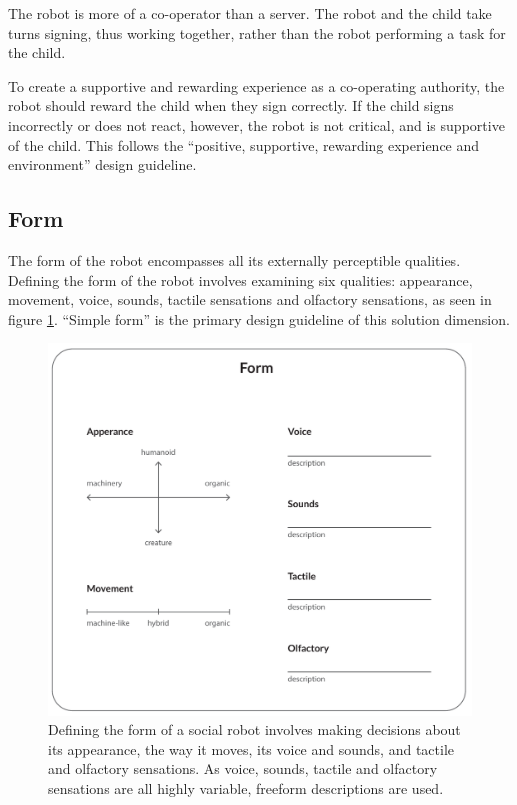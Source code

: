 The robot is more of a co-operator than a server. The robot and the child take turns signing, thus working together, rather than the robot performing a task for the child.

To create a supportive and rewarding experience as a co-operating authority, the robot should reward the child when they sign correctly. If the child signs incorrectly or does not react, however, the robot is not critical, and is supportive of the child. This follows the ``positive, supportive, rewarding experience and environment'' design guideline.


\subsection{Form}

\label{chapter:form}

The form of the robot encompasses all its externally perceptible qualities. Defining the form of the robot involves examining six qualities: appearance, movement, voice, sounds, tactile sensations and olfactory sensations, as seen in figure \ref{fig:form}. ``Simple form'' is the primary design guideline of this solution dimension.

\begin{figure}
  \includegraphics[width=\linewidth]{images/solution_v4-03.pdf}
  \caption{Defining the form of a social robot involves making decisions about its appearance, the way it moves, its voice and sounds, and tactile and olfactory sensations. As voice, sounds, tactile and olfactory sensations are all highly variable, freeform descriptions are used.}
  \label{fig:form}
\end{figure}

